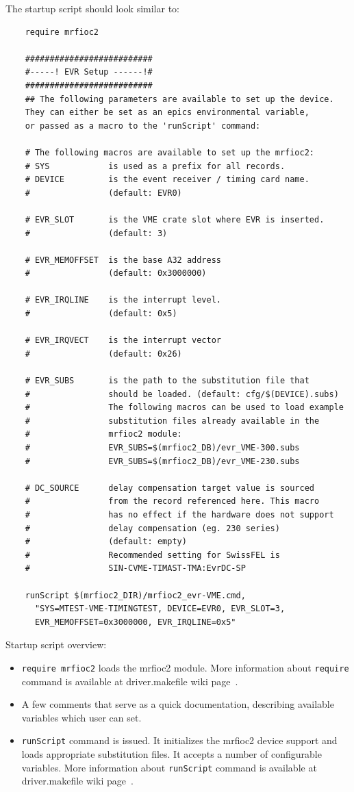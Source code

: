 \documentclass[12pt,a4paper]{article}
\begin{document}
\begin{enumerate}
	The startup script should look similar to:
\begin{verbatim}
	require mrfioc2
	
	##########################
	#-----! EVR Setup ------!#
	##########################
	## The following parameters are available to set up the device. 
	They can either be set as an epics environmental variable, 
	or passed as a macro to the 'runScript' command:
	
	# The following macros are available to set up the mrfioc2:
	# SYS            is used as a prefix for all records.
	# DEVICE         is the event receiver / timing card name. 
	#                (default: EVR0)
	
	# EVR_SLOT       is the VME crate slot where EVR is inserted.
	#                (default: 3)
	
	# EVR_MEMOFFSET	 is the base A32 address 
	#                (default: 0x3000000)
	
	# EVR_IRQLINE    is the interrupt level. 
	#                (default: 0x5)
	
	# EVR_IRQVECT    is the interrupt vector 
	#                (default: 0x26)
	
	# EVR_SUBS       is the path to the substitution file that
	#                should be loaded. (default: cfg/$(DEVICE).subs)
	#                The following macros can be used to load example 
	#                substitution files already available in the 
	#                mrfioc2 module:
	#                EVR_SUBS=$(mrfioc2_DB)/evr_VME-300.subs
	#                EVR_SUBS=$(mrfioc2_DB)/evr_VME-230.subs
	
	# DC_SOURCE	     delay compensation target value is sourced 
	#                from the record referenced here. This macro 
	#                has no effect if the hardware does not support 
	#                delay compensation (eg. 230 series)
	#                (default: empty)
	#                Recommended setting for SwissFEL is
	#                SIN-CVME-TIMAST-TMA:EvrDC-SP
	
	runScript $(mrfioc2_DIR)/mrfioc2_evr-VME.cmd, 
	  "SYS=MTEST-VME-TIMINGTEST, DEVICE=EVR0, EVR_SLOT=3, 
	  EVR_MEMOFFSET=0x3000000, EVR_IRQLINE=0x5"

\end{verbatim}
Startup script overview:
\begin{itemize}
\item 
	\texttt{require mrfioc2} loads the mrfioc2 module. More information about \texttt{require} command is available at driver.makefile wiki page~\cite{driver.makefile}.
\item 
	A few comments that serve as a quick documentation, describing available variables which user can set.
\item 
	\texttt{runScript} command is issued. It initializes the mrfioc2 device support and loads appropriate substitution files. It accepts a number of configurable variables. More information about \texttt{runScript} command is available at driver.makefile wiki page~\cite{driver.makefile}.
\end{itemize}


\end{enumerate}
\end{document}
